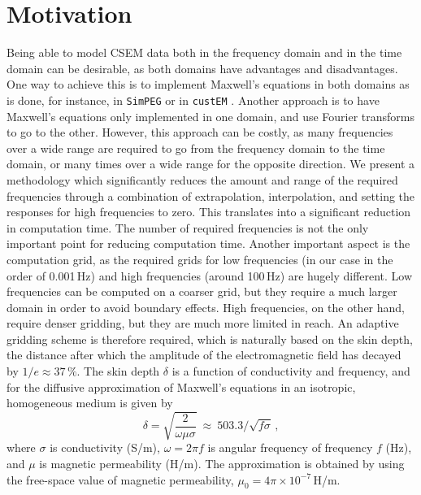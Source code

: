 \documentclass[extra, camera,%
]{gji}
\begin{document}
\section{Motivation}  %

Being able to model CSEM data both in the frequency domain and in the time
domain can be desirable, as both domains have advantages and disadvantages. One
way to achieve this is to implement Maxwell's equations in both domains as is
done, for instance, in \texttt{SimPEG} \citep{CAG.15.Cockett} or in
\texttt{custEM} \citep{GJI.21.Rochlitz}. Another approach is to have Maxwell's
equations only implemented in one domain, and use Fourier transforms to go to
the other. However, this approach can be costly, as many frequencies over a
wide range are required to go from the frequency domain to the time domain, or
many times over a wide range for the opposite direction. We present a
methodology which significantly reduces the amount and range of the required
frequencies through a combination of extrapolation, interpolation, and setting
the responses for high frequencies to zero. This translates into a significant
reduction in computation time. The number of required frequencies is not the
only important point for reducing computation time. Another important aspect is
the computation grid, as the required grids for low frequencies (in our case in
the order of 0.001\,Hz) and high frequencies (around 100\,Hz) are hugely
different. Low frequencies can be computed on a coarser grid, but they require
a much larger domain in order to avoid boundary effects. High frequencies, on
the other hand, require denser gridding, but they are much more limited in
reach. An adaptive gridding scheme is therefore required, which is naturally
based on the skin depth, the distance after which the amplitude of the
electromagnetic field has decayed by $1/e\approx 37\,\%$. The skin depth
$\delta$ is a function of conductivity and frequency, and for the diffusive
approximation of Maxwell's equations in an isotropic, homogeneous medium is
given by \citep[e.g.,][]{B.SEG.88.Ward}
%
\begin{equation}
  \delta = \sqrt{\frac{2}{\omega\mu\sigma}}
  \ \approx \ 503.3/\sqrt{f\sigma} \, ,
  \label{eq:skindepth}
\end{equation}
%
where $\sigma$ is conductivity (S/m), $\omega=2\pi f$ is angular frequency of
frequency $f$ (Hz), and $\mu$ is magnetic permeability (H/m). The approximation
is obtained by using the free-space value of magnetic permeability,
$\mu_0=4\pi\times10^{-7}\,$H/m.
\end{document}

